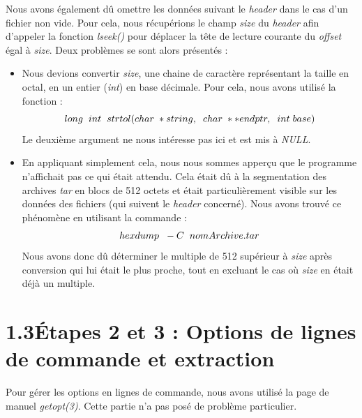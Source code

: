 \documentclass[12pt, a4paper]{report}
\begin{document}
\hspace{0.5cm}Nous avons également dû omettre les données suivant le \textit{header} dans le cas d'un fichier non vide. Pour cela, nous récupérions le champ \textit{size} du \textit{header} afin d'appeler la fonction \textit{lseek()} pour déplacer la tête de lecture courante du \textit{offset} égal à \textit{size}. Deux problèmes se sont alors présentés : 
\begin{itemize}
\item \hspace{0.2cm}Nous devions convertir \textit{size}, une chaine de caractère représentant la taille en octal, en un entier (\textit{int}) en base décimale. Pour cela, nous avons utilisé la fonction : \[long\hspace{0.2cm}int\hspace{0.2cm}strtol(char\hspace{0.1cm}*string,\hspace{0.2cm}char\hspace{0.1cm}**endptr,\hspace{0.2cm}int\hspace{0.1cm}base)\]Le deuxième argument ne nous intéresse pas ici et est mis à \textit{NULL}.
\item \hspace{0.2cm}En appliquant simplement cela, nous nous sommes apperçu que le programme n'affichait pas ce qui était attendu. Cela était dû à la segmentation des archives \textit{tar} en blocs de 512 octets et était particulièrement visible sur les données des fichiers (qui suivent le \textit{header} concerné). Nous avons trouvé ce phénomène en utilisant la commande : \[hexdump\hspace{0.2cm}-C\hspace{0.2cm}nomArchive.tar\] Nous avons donc dû déterminer le multiple de 512 supérieur à \textit{size} après conversion qui lui était le plus proche, tout en excluant le cas où \textit{size} en était déjà un multiple.
\end{itemize}

\section*{\hspace{0.6cm}1.3\hspace{0.6cm}Étapes 2 et 3 : Options de lignes de commande et extraction}
\hspace{1cm}Pour gérer les options en lignes de commande, nous avons utilisé la page de manuel \textit{getopt(3)}. Cette partie n'a pas posé de problème particulier.\\
\end{document}

